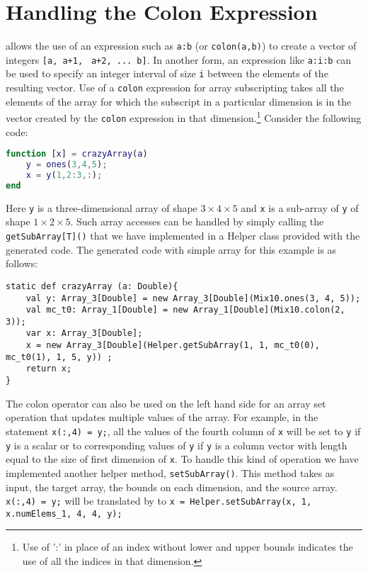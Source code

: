 \section{Handling the Colon Expression}

\matlab allows the use of an expression such as \verb|a:b| (or
\texttt{colon(a,b)}) to create a vector of integers 
\verb|[a, a+1,| \verb| a+2, ... b]|. In another form, an expression like 
\verb|a:i:b| can be used to
specify an integer interval of size \verb|i| between the elements of the
resulting vector. Use of a \verb|colon| expression for
array subscripting takes all the elements of the array for
which the subscript in a particular dimension is in the vector
created by the \verb|colon| expression in that
dimension.\footnote{Use of ':' in place of an index without lower and
upper bounds indicates the use of all the indices in that dimension.}
Consider the following \matlab code:

\begin{lstlisting}[language=Matlab,numbers=none]                                
function [x] = crazyArray(a)                                                    
    y = ones(3,4,5);                                                            
    x = y(1,2:3,:);                                                             
end                                                                             
\end{lstlisting}

\noindent
Here \verb|y| is a three-dimensional array of shape $3\times4\times5$ and
\verb|x| is a sub-array of \verb|y| of shape $1\times2\times5$. 
Such array accesses can be handled by simply calling the \verb|getSubArray[T]()|
that we have implemented in a Helper class provided with the generated code. 
The generated \xten code with simple array for this example is as follows:

\begin{lstlisting}[language=x10,numbers=none]                                
static def crazyArray (a: Double){
    val y: Array_3[Double] = new Array_3[Double](Mix10.ones(3, 4, 5));
    val mc_t0: Array_1[Double] = new Array_1[Double](Mix10.colon(2, 3));
    var x: Array_3[Double];
    x = new Array_3[Double](Helper.getSubArray(1, 1, mc_t0(0), mc_t0(1), 1, 5, y)) ;
    return x;
}
\end{lstlisting}

The colon operator can also be used on the left hand side for an array set
operation that updates multiple values of the array. For example, in the
\matlab statement \texttt{x(:,4) = y;}, all the values of the fourth column of
\verb|x| will be set to \verb|y| if \verb|y| is a scalar or to corresponding
values of \verb|y| if \verb|y| is a column vector with length equal to the size
of first dimension of \verb|x|. To handle this kind of operation we have
implemented another helper method, \texttt{setSubArray()}. This method takes as
input, the target array, the bounds on each dimension, and the source array.
\texttt{x(:,4) = y;} will be translated by \mixten to \texttt{x =
Helper.setSubArray(x, 1, x.numElems\_1, 4, 4, y);}

